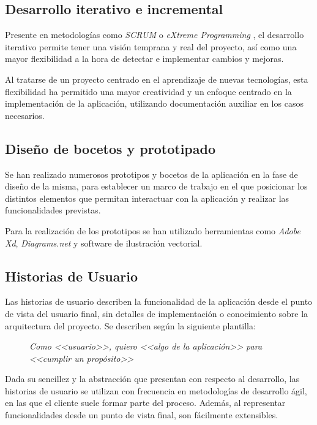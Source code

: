 \documentclass[10pt, a4paper]{aqademic}
\begin{document}
\subsection*{Desarrollo iterativo e incremental}

Presente en metodologías como \textit{SCRUM} \cite{Schwaber04} o \textit{eXtreme Programming} \cite{BecAnd04extreme}, el desarrollo iterativo permite tener una visión temprana y real del proyecto, así como una mayor flexibilidad a la hora de detectar e implementar cambios y mejoras.

\medskip

Al tratarse de un proyecto centrado en el aprendizaje de nuevas tecnologías, esta flexibilidad ha permitido una mayor creatividad y un enfoque centrado en la implementación de la aplicación, utilizando documentación auxiliar en los casos necesarios.


\subsection*{Diseño de bocetos y prototipado}

Se han realizado numerosos prototipos y bocetos de la aplicación en la fase de diseño de la misma, para establecer un marco de trabajo en el que posicionar los 
distintos elementos que permitan interactuar con la aplicación y realizar las funcionalidades previstas.

Para la realización de los prototipos se han utilizado herramientas como \textit{Adobe Xd}, \textit{Diagrams.net} y software de ilustración vectorial.


\subsection*{Historias de Usuario}

Las historias de usuario describen la funcionalidad de la aplicación desde el punto de vista del usuario final, sin detalles de implementación o conocimiento sobre la arquitectura del proyecto. Se describen según la siguiente plantilla:

\medskip

\begin{figure}[h]
	\centering
	\textit{Como <<usuario>>, quiero <<algo de la aplicación>> para <<cumplir un propósito>>}
\end{figure}

Dada su sencillez y la abstracción que presentan con respecto al desarrollo, las historias de usuario se utilizan con frecuencia en metodologías de desarrollo ágil, en las que el cliente suele formar parte del proceso. Además, al representar funcionalidades desde un punto de vista final, son fácilmente extensibles.
\end{document}
